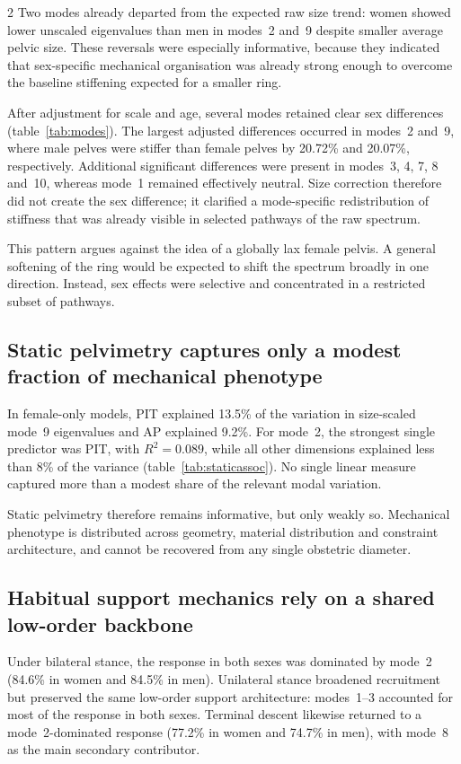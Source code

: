 \documentclass[openacc]{rsproca_new}
\begin{document}
\begin{multicols}{2}
Two modes already departed from the expected raw size trend: women showed lower unscaled eigenvalues than men in modes~2 and~9 despite smaller average pelvic size. These reversals were especially informative, because they indicated that sex-specific mechanical organisation was already strong enough to overcome the baseline stiffening expected for a smaller ring.

After adjustment for scale and age, several modes retained clear sex differences (table~\ref{tab:modes}). The largest adjusted differences occurred in modes~2 and~9, where male pelves were stiffer than female pelves by 20.72\% and 20.07\%, respectively. Additional significant differences were present in modes~3, 4, 7, 8 and~10, whereas mode~1 remained effectively neutral. Size correction therefore did not create the sex difference; it clarified a mode-specific redistribution of stiffness that was already visible in selected pathways of the raw spectrum.

This pattern argues against the idea of a globally lax female pelvis. A general softening of the ring would be expected to shift the spectrum broadly in one direction. Instead, sex effects were selective and concentrated in a restricted subset of pathways.

\subsection{Static pelvimetry captures only a modest fraction of mechanical phenotype}

In female-only models, PIT explained 13.5\% of the variation in size-scaled mode~9 eigenvalues and AP explained 9.2\%. For mode~2, the strongest single predictor was PIT, with $R^2=0.089$, while all other dimensions explained less than 8\% of the variance (table~\ref{tab:staticassoc}). No single linear measure captured more than a modest share of the relevant modal variation.

Static pelvimetry therefore remains informative, but only weakly so. Mechanical phenotype is distributed across geometry, material distribution and constraint architecture, and cannot be recovered from any single obstetric diameter.

\subsection{Habitual support mechanics rely on a shared low-order backbone}

Under bilateral stance, the response in both sexes was dominated by mode~2 (84.6\% in women and 84.5\% in men). Unilateral stance broadened recruitment but preserved the same low-order support architecture: modes~1--3 accounted for most of the response in both sexes. Terminal descent likewise returned to a mode~2-dominated response (77.2\% in women and 74.7\% in men), with mode~8 as the main secondary contributor.


\end{multicols}
\end{document}
